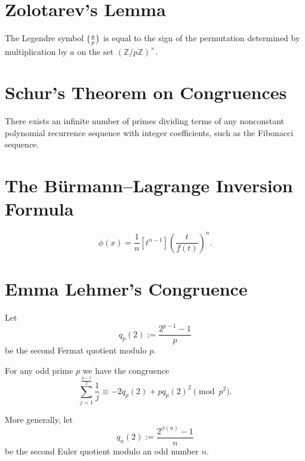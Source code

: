 \section{Zolotarev's Lemma}

\begin{theorem}
  The Legendre symbol $\legendre{a}{p}$ is equal to the sign of the permutation determined by multiplication by $a$ on the set $(\mathbb{Z}/p\mathbb{Z})^\times$.
\end{theorem}


\section{Schur's Theorem on Congruences}

There exists an infinite number of primes dividing terms of any nonconstant polynomial recurrence sequence with integer coefficients, such as the Fibonacci sequence.

\section{The B\"{u}rmann--Lagrange Inversion Formula}

\begin{equation*}
  [x^n]\phi(x) = \frac{1}{n}[t^{n-1}]\left(\frac{t}{f(t)}\right)^n.
\end{equation*}

\section{Emma Lehmer's Congruence}

Let
\begin{equation*}
  q_p(2):=\frac{2^{p-1}-1}{p}
\end{equation*}
be the second Fermat quotient modulo $p$.

\begin{theorem}
  For any odd prime $p$ we have the congruence
  \begin{equation*}
    \sum_{j=1}^{\frac{p-1}{2}}\frac{1}{j}\equiv -2 q_p(2)+ pq_p(2)^2\pmod{p^2}.
  \end{equation*}
\end{theorem}

More generally, let
\begin{equation*}
  q_n(2):=\frac{2^{\phi(n)}-1}{n}
\end{equation*}
be the second Euler quotient modulo an odd number $n$.

